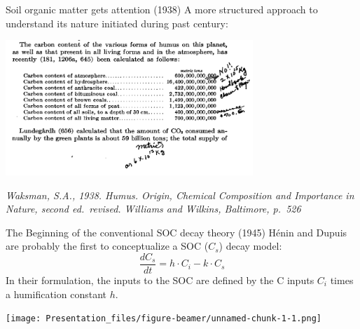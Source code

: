 \documentclass[
  ignorenonframetext,
]{beamer}
\begin{document}
\begin{frame}{Soil organic matter gets attention (1938)}
\protect\hypertarget{soil-organic-matter-gets-attention-1938}{}
A more structured approach to understand its nature initiated during
past century:

\includegraphics[width=0.7\textwidth,height=\textheight]{waksman_1938.png}

\emph{Waksman, S.A., 1938. Humus. Origin, Chemical Composition and
Importance in Nature, second ed.~revised. Williams and Wilkins,
Baltimore, p.~526}
\end{frame}

\begin{frame}{The Beginning of the conventional SOC decay theory (1945)}
\protect\hypertarget{the-beginning-of-the-conventional-soc-decay-theory-1945}{}
Hénin and Dupuis are probably the first to conceptualize a SOC (\(C_s\))
decay model: \[
\frac{dC_s}{dt} = h \cdot C_i - k \cdot C_s
\] In their formulation, the inputs to the SOC are defined by the C
inputs \(C_i\) times a humification constant \(h\).

\texttt{[image: Presentation\_files/figure-beamer/unnamed-chunk-1-1.png]}
\end{frame}
\end{document}
